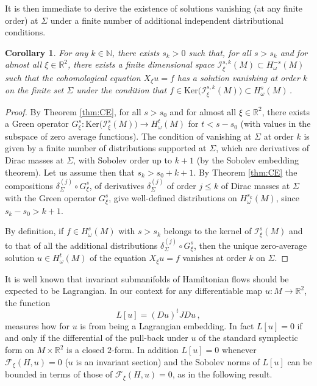 \documentclass[11pt]{amsart}
\newcommand \R {{ \mathbb R}}
\newcommand \N {{ \mathbb N}}
\newtheorem{corollary}[theorem]{Corollary}
\begin{document}
It is then immediate to derive the existence of solutions vanishing (at any finite order) at $\Sigma$ under a finite number of additional 
independent distributional  conditions.

\begin{corollary} 
\label{cor:CE}
For any $k\in \N$, there exists $s_k >0$ such that, for all $s >s_k$ and for almost all $\xi \in \R^2$,  there exists a finite dimensional
space $\mathcal  I^{s,k}_\xi (M) \subset H^{-s}_\omega(M)$ such that  the cohomological equation $X_\xi u =f$ has a solution vanishing at order $k$
on the finite set $\Sigma$ under the condition that $f \in \text{Ker}\Big( \mathcal  I^{s,k}_\xi (M) \Big)  \subset H^{s}_\omega(M)$\,.
\end{corollary} 
\begin{proof} By Theorem \ref{thm:CE}, for all $s>s_0$ and for almost all $\xi\in \R^2$,  there exists a Green operator $G^s_\xi : \text{Ker}\Big( \mathcal  I^{s}_\xi (M) \Big)  \to
H^t_\omega(M)$ for $t<s-s_0$  (with values in the subspace of zero average functions). The condition of vanishing at $\Sigma$ at order $k$ is
given by a finite number of distributions supported at $\Sigma$, which are derivatives of Dirac masses at $\Sigma$, with Sobolev order up to 
$k+1$ (by the Sobolev embedding theorem). Let us assume then that $s_k> s_0 + k +1$. By Theorem  \ref{thm:CE} the compositions $\delta_\Sigma^{(j)} \circ G_\xi^s$,
of derivatives $\delta_\Sigma^{(j)}$ of order $j\leq k$ of Dirac masses at $\Sigma$ with the Green operator $G^s_\xi$, give well-defined distributions on 
$H^{s_k}_\omega(M)$, since $s_k -s_0  > k+1$. 

By definition, if $f\in H^s_\omega(M)$ with $s>s_k$ belongs to 
the kernel of $\mathcal  I^{s}_\xi (M)$ and to that of all the additional distributions $\delta_\Sigma^{(j)} \circ G_\xi^s$, then the unique zero-average solution
$u\in H^t_\omega(M)$ of the equation $X_\xi u=f$ vanishes at order $k$ on $\Sigma$.

\end{proof} 

\smallskip
\noindent It is well known that invariant submanifolds of Hamiltonian flows should be expected to be Lagrangian.  In our context
for any differentiable map $u: M \to \R^2$,  the function
$$
L[u]=  (Du)^t J Du \,,
$$
measures how for $u$ is from being a Lagrangian embedding.   In fact $L[u]=0$ if and only if the differential of the pull-back  under 
$u$ of the standard symplectic form on $M \times \R^2$ is a closed $2$-form. In addition $L[u] =0$ whenever
$\mathcal{F}_\xi(H, u)=0$ ($u$ is an invariant section) and the Sobolev norms of $L[u]$ can be bounded in terms of those of $\mathcal{F}_\xi(H, u)=0$,
as in the following result.
\end{document}
